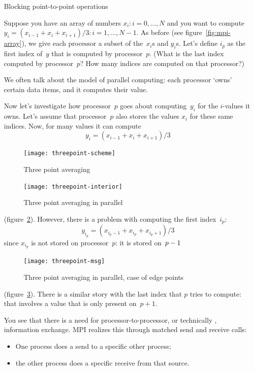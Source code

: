 
 {Blocking point-to-point operations}

Suppose you have an array of numbers $x_i\colon i=0,\ldots,N$
and you want to compute $y_i=(x_{i-1}+x_i+x_{i+1})/3\colon i=1,\ldots,N-1$.
As before (see figure~\ref{fig:mpi-array}), we give each processor
a subset of the~$x_i$s and $y_i$s.
Let's define $i_p$ as the first index of~$y$ that is
computed by processor~$p$. (What is the last index computed by processor~$p$?
How many indices are computed on that processor?)

We often talk about the 
model of parallel computing: each processor `owns' certain data items,
and it computes their value.

Now let's investigate how processor~$p$ goes about computing~$y_i$ for
the $i$-values it owns. Let's assume that processor~$p$ also stores
the values $x_i$ for these same indices.
Now, for many values it can compute
\[ y_{i} = (x_{i-1}+x_{i}+x_{i+1})/3 \]
%
\begin{figure}[ht]
  \texttt{[image: threepoint-scheme]}
  \caption{Three point averaging}
  \label{fig:3pt}
\end{figure}
%
\begin{figure}[ht]
  \texttt{[image: threepoint-interior]}
  \caption{Three point averaging in parallel}
  \label{fig:3pt-interior}
\end{figure}
%
(figure~\ref{fig:3pt-interior}).
However, there is a problem with computing the first index~$i_p$:
\[ y_{i_p} = (x_{i_p-1}+x_{i_p}+x_{i_p+1})/3 \]
since $x_{i_p}$ is not stored on processor~$p$: it is stored on~$p-\nobreak1$
%
\begin{figure}[ht]
  \texttt{[image: threepoint-msg]}
  \caption{Three point averaging in parallel, case of edge points}
  \label{fig:3pt-msg}
\end{figure}
%
(figure~\ref{fig:3pt-msg}).
There is a similar story with the last index that $p$ tries to compute:
that involves a value that is only present on~$p+1$.

You see that there is a need for processor-to-processor, or
technically , information exchange.
MPI realizes this through matched send and receive calls:
\begin{itemize}
\item One process does a send to a specific other process;
\item the other process does a specific receive from that source.
\end{itemize}

